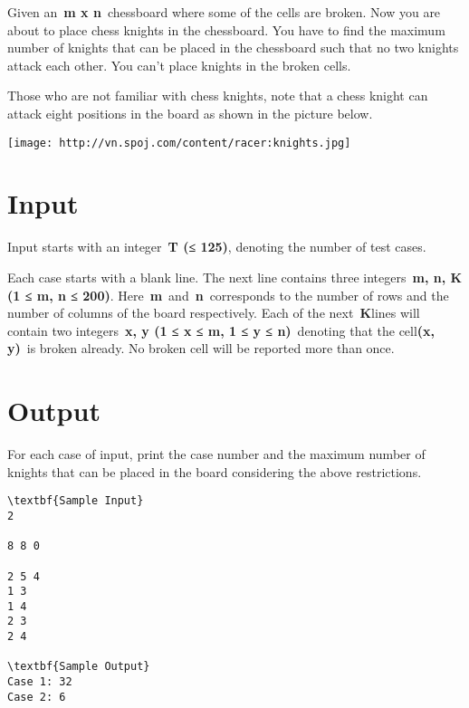 

Given an \textbf{m x n} chessboard where some of the cells are broken. Now you are about to place chess knights in the chessboard. You have to find the maximum number of knights that can be placed in the chessboard such that no two knights attack each other. You can't place knights in the broken cells.

Those who are not familiar with chess knights, note that a chess knight can attack eight positions in the board as shown in the picture below.


\texttt{[image: http://vn.spoj.com/content/racer:knights.jpg]}

\section{Input}

Input starts with an integer \textbf{T (}\textbf{≤ 125)}, denoting the number of test cases.

Each case starts with a blank line. The next line contains three integers \textbf{m, n, K (1 ≤ m, n ≤ 200)}. Here \textbf{m} and \textbf{n} corresponds to the number of rows and the number of columns of the board respectively. Each of the next \textbf{K}lines will contain two integers \textbf{x, y (1 ≤ x ≤ m, 1 ≤ y ≤ n)} denoting that the cell\textbf{(x, y)} is broken already. No broken cell will be reported more than once.

\section{Output}

For each case of input, print the case number and the maximum number of knights that can be placed in the board considering the above restrictions.
\begin{verbatim}
\textbf{Sample Input}
2

8 8 0

2 5 4
1 3
1 4
2 3
2 4

\textbf{Sample Output}
Case 1: 32
Case 2: 6\end{verbatim}